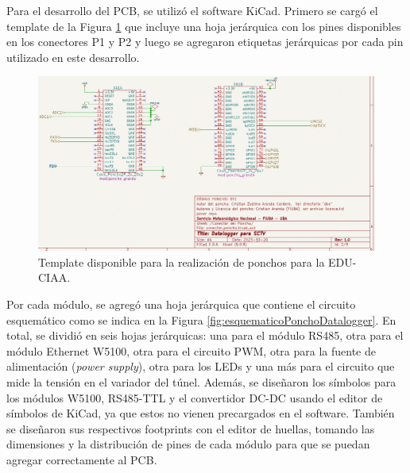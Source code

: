Para el desarrollo del PCB, se utilizó el software KiCad. Primero se cargó el template de la Figura \ref{fig:HojaTemplatePonchoCiaa} que incluye una hoja jerárquica con los pines disponibles en los conectores P1 y P2 y luego se agregaron etiquetas jerárquicas por cada pin utilizado en este desarrollo.

\begin{figure}[H]
    \centering
    \includegraphics[width=0.95\linewidth]{Figuras/datalogger/Hardware/HojaTemplatePonchoCiaa.png}
    \caption{Template disponible para la realización de ponchos para la EDU-CIAA.}
    \label{fig:HojaTemplatePonchoCiaa}
\end{figure}


Por cada módulo, se agregó una hoja jerárquica que contiene el circuito esquemático como se indica en la Figura \ref{fig:esquematicoPonchoDatalogger}. En total, se dividió en seis hojas jerárquicas: una para el módulo RS485, otra para el módulo Ethernet W5100, otra para el circuito PWM, otra para la fuente de alimentación (\textit{power supply}), otra para los LEDs y una más para el circuito que mide la tensión en el variador del túnel. Además, se diseñaron los símbolos para los módulos W5100, RS485-TTL y el convertidor DC-DC usando el editor de símbolos de KiCad, ya que estos no vienen precargados en el software. También se diseñaron sus respectivos footprints con el editor de huellas, tomando las dimensiones y la distribución de pines de cada módulo para que se puedan agregar correctamente al PCB.

